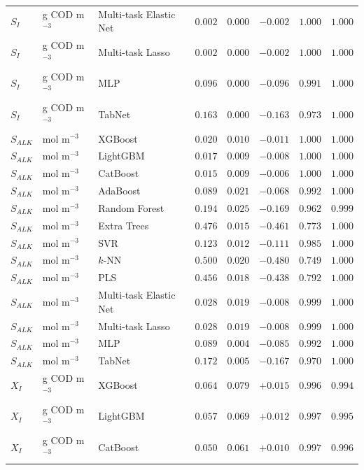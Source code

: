 \begin{longtable}{llp{3.1cm}rrrrr}
$S_{I}$ & g COD m$^{-3}$ & Multi-task Elastic Net & $0.002$ & $0.000$ & $-0.002$ & $1.000$ & $1.000$ \\
$S_{I}$ & g COD m$^{-3}$ & Multi-task Lasso & $0.002$ & $0.000$ & $-0.002$ & $1.000$ & $1.000$ \\
$S_{I}$ & g COD m$^{-3}$ & MLP & $0.096$ & $0.000$ & $-0.096$ & $0.991$ & $1.000$ \\
$S_{I}$ & g COD m$^{-3}$ & TabNet & $0.163$ & $0.000$ & $-0.163$ & $0.973$ & $1.000$ \\
$S_{ALK}$ & mol m$^{-3}$ & XGBoost & $0.020$ & $0.010$ & $-0.011$ & $1.000$ & $1.000$ \\
$S_{ALK}$ & mol m$^{-3}$ & LightGBM & $0.017$ & $0.009$ & $-0.008$ & $1.000$ & $1.000$ \\
$S_{ALK}$ & mol m$^{-3}$ & CatBoost & $0.015$ & $0.009$ & $-0.006$ & $1.000$ & $1.000$ \\
$S_{ALK}$ & mol m$^{-3}$ & AdaBoost & $0.089$ & $0.021$ & $-0.068$ & $0.992$ & $1.000$ \\
$S_{ALK}$ & mol m$^{-3}$ & Random Forest & $0.194$ & $0.025$ & $-0.169$ & $0.962$ & $0.999$ \\
$S_{ALK}$ & mol m$^{-3}$ & Extra Trees & $0.476$ & $0.015$ & $-0.461$ & $0.773$ & $1.000$ \\
$S_{ALK}$ & mol m$^{-3}$ & SVR & $0.123$ & $0.012$ & $-0.111$ & $0.985$ & $1.000$ \\
$S_{ALK}$ & mol m$^{-3}$ & $k$-NN & $0.500$ & $0.020$ & $-0.480$ & $0.749$ & $1.000$ \\
$S_{ALK}$ & mol m$^{-3}$ & PLS & $0.456$ & $0.018$ & $-0.438$ & $0.792$ & $1.000$ \\
$S_{ALK}$ & mol m$^{-3}$ & Multi-task Elastic Net & $0.028$ & $0.019$ & $-0.008$ & $0.999$ & $1.000$ \\
$S_{ALK}$ & mol m$^{-3}$ & Multi-task Lasso & $0.028$ & $0.019$ & $-0.008$ & $0.999$ & $1.000$ \\
$S_{ALK}$ & mol m$^{-3}$ & MLP & $0.089$ & $0.004$ & $-0.085$ & $0.992$ & $1.000$ \\
$S_{ALK}$ & mol m$^{-3}$ & TabNet & $0.172$ & $0.005$ & $-0.167$ & $0.970$ & $1.000$ \\
$X_{I}$ & g COD m$^{-3}$ & XGBoost & $0.064$ & $0.079$ & $+0.015$ & $0.996$ & $0.994$ \\
$X_{I}$ & g COD m$^{-3}$ & LightGBM & $0.057$ & $0.069$ & $+0.012$ & $0.997$ & $0.995$ \\
$X_{I}$ & g COD m$^{-3}$ & CatBoost & $0.050$ & $0.061$ & $+0.010$ & $0.997$ & $0.996$ \\

\end{longtable}
